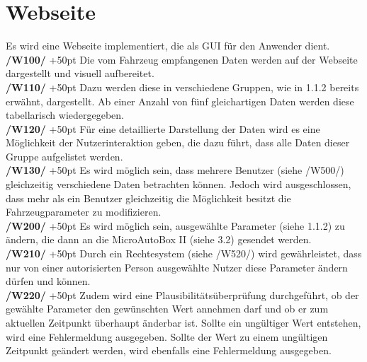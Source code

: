 \documentclass[fontsize = 12pt, paper = a4]{scrreprt}
\begin{document}

\section{Webseite} 

Es wird eine Webseite implementiert, die als \gls{GUI} für den Anwender dient. \\

\textbf{/W100/} 
\hangindent+50pt 
Die vom Fahrzeug empfangenen Daten werden auf der Webseite dargestellt und visuell aufbereitet. \\

\textbf{/W110/}
\hangindent+50pt 
Dazu werden diese in verschiedene Gruppen, wie in 1.1.2 bereits erwähnt, dargestellt. Ab einer Anzahl von fünf gleichartigen Daten werden diese tabellarisch wiedergegeben. \\

\textbf{/W120/} 
\hangindent+50pt 
Für eine detaillierte Darstellung der Daten wird es eine Möglichkeit der Nutzerinteraktion geben, die dazu führt, dass alle Daten dieser Gruppe aufgelistet werden. \\

\textbf{/W130/} 
\hangindent+50pt 
Es wird möglich sein, dass mehrere Benutzer (siehe /W500/) gleichzeitig verschiedene Daten betrachten können. Jedoch wird ausgeschlossen, dass mehr als ein Benutzer gleichzeitig die Möglichkeit besitzt die Fahrzeugparameter zu modifizieren. \\

\textbf{/W200/} 
\hangindent+50pt 
Es wird möglich sein, ausgewählte Parameter (siehe 1.1.2) zu ändern, die dann an die \gls{MicroAutoBox II} (siehe 3.2) gesendet werden. \\

\textbf{/W210/} 
\hangindent+50pt 
Durch ein \gls{Rechtesystem} (siehe /W520/) wird gewährleistet, dass nur von einer autorisierten Person ausgewählte Nutzer diese Parameter ändern dürfen und können. \\

\textbf{/W220/} 
\hangindent+50pt 
Zudem wird eine Plausibilitätsüberprüfung  durchgeführt, ob der gewählte Parameter den gewünschten Wert annehmen darf und ob er zum aktuellen Zeitpunkt überhaupt änderbar ist. Sollte ein ungültiger Wert entstehen, wird eine Fehlermeldung ausgegeben. Sollte der Wert zu einem ungültigen Zeitpunkt geändert werden, wird ebenfalls eine Fehlermeldung ausgegeben. \\
\end{document}
